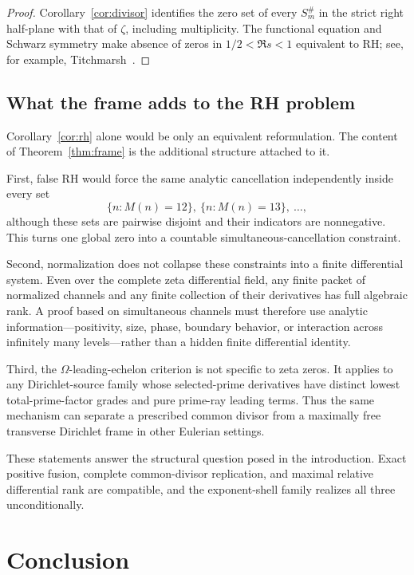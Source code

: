 \documentclass[11pt]{article}
\theoremstyle{definition}
\theoremstyle{remark}
\begin{document}
\begin{proof}
Corollary~\ref{cor:divisor} identifies the zero set of every \(S_m^\#\) in the strict right
half-plane with that of \(\zeta\), including multiplicity.  The functional equation and Schwarz
symmetry make absence of zeros in \(1/2<\Re s<1\) equivalent to RH; see, for example,
Titchmarsh~\cite[Chapter II]{Titchmarsh1986}.
\end{proof}

\subsection{What the frame adds to the RH problem}

Corollary~\ref{cor:rh} alone would be only an equivalent reformulation.  The content of
Theorem~\ref{thm:frame} is the additional structure attached to it.

First, false RH would force the same analytic cancellation independently inside every set
\[
 \{n:M(n)=12\},\ \{n:M(n)=13\},\ \ldots,
 \tag{6.2}
\]
although these sets are pairwise disjoint and their indicators are nonnegative.  This turns one
global zero into a countable simultaneous-cancellation constraint.

Second, normalization does not collapse these constraints into a finite differential system.
Even over the complete zeta differential field, any finite packet of normalized channels and
any finite collection of their derivatives has full algebraic rank.  A proof based on
simultaneous channels must therefore use analytic information---positivity, size, phase,
boundary behavior, or interaction across infinitely many levels---rather than a hidden finite
differential identity.

Third, the \(\Omega\)-leading-echelon criterion is not specific to zeta zeros.  It applies to any
Dirichlet-source family whose selected-prime derivatives have distinct lowest
total-prime-factor grades and pure prime-ray leading terms.  Thus the same mechanism can
separate a prescribed common divisor from a maximally free transverse Dirichlet frame in other
Eulerian settings.

These statements answer the structural question posed in the introduction.  Exact positive
fusion, complete common-divisor replication, and maximal relative differential rank are
compatible, and the exponent-shell family realizes all three unconditionally.

\section{Conclusion}
\end{document}
